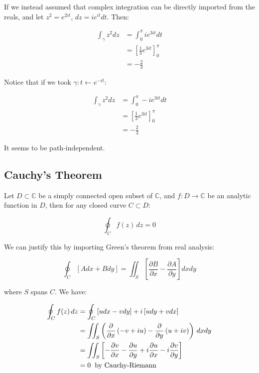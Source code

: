 \documentclass{physics_notes}
\begin{document}
If we instead assumed that complex integration can be directly imported from the reals, and let $z^2 = e^{2it}$, $dz = ie^{it}dt$. Then:

\begin{align*}
\int_\gamma z^2 dz &= \int_{0}^{\pi} ie^{3it} dt \\
&= \left[\frac{1}{3}e^{3it}\right]_{0}^{\pi} \\
&= -\frac{2}{3}
\end{align*}

Notice that if we took $\gamma: t \leftarrow e^{-it}$:

\begin{align*}
\int_\gamma z^2 dz &= \int_{0}^{\pi} -ie^{3it} dt \\
&= \left[\frac{1}{3}e^{3it}\right]_{0}^{\pi} \\
&= -\frac{2}{3}
\end{align*}

It seems to be path-independent. 

\subsection{Cauchy's Theorem }

Let $D \subset \mathbb{C}$ be a simply connected open subset of $\mathbb{C}$, and $f: D \rightarrow \mathbb{C}$ be an analytic function in $D$, then for any closed curve $C \subset D$:

\[ \oint_C f(z) \,dz = 0 \]

We can justify this by importing Green's theorem from real analysis:

\[ \oint_C \left[ Adx + Bdy \right] = \iint_S \left[ \frac{\partial B}{\partial x} - \frac{\partial A}{\partial y} \right] dx dy \]

where $S$ spans $C$. We have:

\begin{align*}
\oint_C f(z)\, dz &= \oint_C \left[ udx - vdy \right] + i\left[udy + vdx\right] \\
&= \iint_S \left(\frac{\partial}{\partial x}\left(-v + iu\right) - \frac{\partial}{\partial y}\left(u + iv\right)\right)\, dxdy \\
&= \iint_S \left[-\frac{\partial v}{\partial x} - \frac{\partial u}{\partial y} + i\frac{\partial u}{\partial x} - i\frac{\partial v}{\partial y}\right] \\
&= 0 \hspace{.2cm} \text{by Cauchy-Riemann}
\end{align*}
\end{document}
